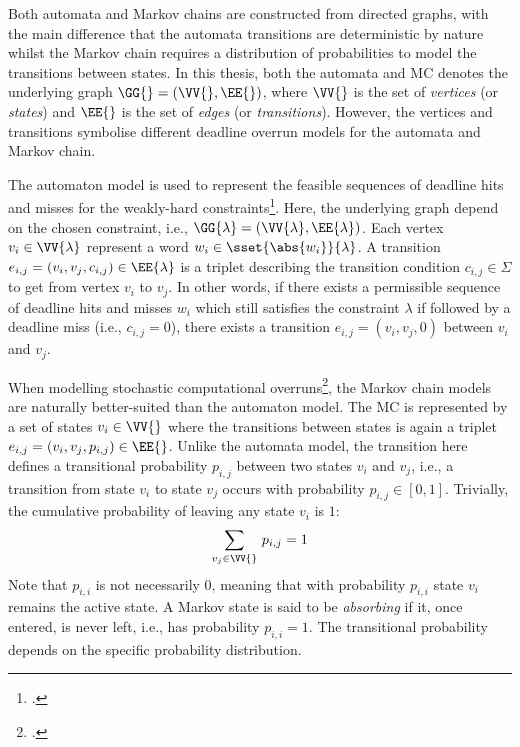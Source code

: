 Both automata and Markov chains are constructed from directed graphs, with the main difference that the automata transitions are deterministic by nature whilst the Markov chain requires a distribution of probabilities to model the transitions between states.
In this thesis, both the automata and MC denotes the underlying graph $\GG{} = (\VV{}, \EE{})$, where $\VV{}$ is the set of \emph{vertices} (or \emph{states}) and $\EE{}$ is the set of \emph{edges} (or \emph{transitions}).
However, the vertices and transitions symbolise different deadline overrun models for the automata and Markov chain.

The automaton model is used to represent the feasible sequences of deadline hits and misses for the weakly-hard constraints\footnote{.}.
Here, the underlying graph depend on the chosen constraint, i.e., $\GG{\lambda} = (\VV{\lambda}, \EE{\lambda})$.
Each vertex $v_i \in \VV{\lambda}$ represent a word $w_i \in \sset{\abs{w_i}}{\lambda}$.
A transition $e_{i, j} = (v_i, v_j, c_{i,j}) \in \EE{\lambda}$ is a triplet describing the transition condition $c_{i,j} \in \Sigma$ to get from vertex $v_i$ to $v_j$.
In other words, if there exists a permissible sequence of deadline hits and misses $w_i$ which still satisfies the constraint $\lambda$ if followed by a deadline miss (i.e., $c_{i,j} = 0$), there exists a transition $e_{i,j} = (v_i, v_j, 0)$ between $v_i$ and $v_j$.

When modelling stochastic computational overruns\footnote{.}, the Markov chain models are naturally better-suited than the automaton model.
The MC is represented by a set of states $v_i \in \VV{}$ where the transitions between states is again a triplet $e_{i, j} = (v_i, v_j, p_{i, j}) \in \EE{}$.
Unlike the automata model, the transition here defines a transitional probability $p_{i, j}$ between two states $v_i$ and $v_j$, i.e., a transition from state $v_i$ to state $v_j$ occurs with probability $p_{i, j} \in [0, 1]$.
Trivially, the cumulative probability of leaving any state $v_i$ is $1$:
%
\begin{equation*}
    \sum_{v_j\in\VV{}}\, p_{i, j} = 1
\end{equation*}
%
Note that $p_{i, i}$ is not necessarily $0$, meaning that with probability $p_{i, i}$ state $v_i$ remains the active state.
A Markov state is said to be \emph{absorbing} if it, once entered, is never left, i.e., has probability $p_{i, i} = 1$.
The transitional probability depends on the specific probability distribution.

